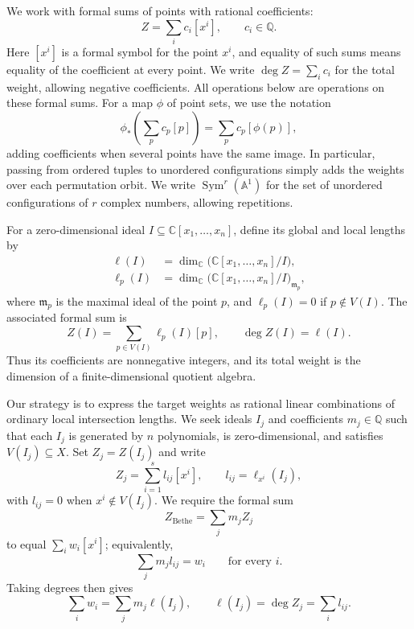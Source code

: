 \documentclass[11pt]{article}
\theoremstyle{definition}
\newcommand{\A}{\mathbb A}
\newcommand{\C}{\mathbb C}
\newcommand{\Sym}{\operatorname{Sym}}
\begin{document}
We work with formal sums of points with rational coefficients:
\[
 Z=\sum_i c_i[x^i],\qquad c_i\in\mathbb Q.
\]
Here $[x^i]$ is a formal symbol for the point $x^i$, and equality of
such sums means equality of the coefficient at every point. We write
$\deg Z=\sum_i c_i$ for the total weight, allowing negative coefficients.
All operations below are operations on these formal sums.
For a map $\phi$ of point sets, we use the notation
\[
 \phi_*\!\left(\sum_p c_p[p]\right)=\sum_p c_p[\phi(p)],
\]
adding coefficients when several points have the same image. In
particular, passing from ordered tuples to unordered configurations
simply adds the weights over each permutation orbit. We write
$\Sym^r(\A^1)$ for the set of unordered configurations of $r$ complex
numbers, allowing repetitions.

For a zero-dimensional ideal $I\subseteq\C[x_1,\ldots,x_n]$, define
its global and local lengths by
\[
 \begin{aligned}
 \ell(I)&=\dim_\C\bigl(\C[x_1,\ldots,x_n]/I\bigr),\\
 \ell_p(I)&=\dim_\C\bigl(\C[x_1,\ldots,x_n]/I\bigr)_{\mathfrak m_p},
 \end{aligned}
\]
where $\mathfrak m_p$ is the maximal ideal of the point $p$, and
$\ell_p(I)=0$ if $p\notin V(I)$. The associated formal sum is
\[
 Z(I)=\sum_{p\in V(I)}\ell_p(I)[p],\qquad
 \deg Z(I)=\ell(I).
\]
Thus its coefficients are nonnegative integers, and its total weight
is the dimension of a finite-dimensional quotient algebra.

Our strategy is to express the target weights as rational linear
combinations of ordinary local intersection lengths. We seek ideals
$I_j$ and coefficients $m_j\in\mathbb Q$ such that each $I_j$ is
generated by $n$ polynomials, is zero-dimensional, and satisfies
$V(I_j)\subseteq X$. Set $Z_j=Z(I_j)$ and write
\[
 Z_j=\sum_{i=1}^s l_{ij}[x^i],\qquad
 l_{ij}=\ell_{x^i}(I_j),
\]
with $l_{ij}=0$ when $x^i\notin V(I_j)$. We require the formal sum
\begin{equation}\label{eq:weight-cycle}
 Z_{\text{Bethe}}=\sum_jm_jZ_j
\end{equation}
to equal $\sum_iw_i[x^i]$; equivalently,
\begin{equation}\label{eq:local-weight-decomposition}
	\sum_j m_jl_{ij}=w_i\qquad\text{for every }i.
\end{equation}
Taking degrees then gives
\begin{equation}\label{eq:global-weight-decomposition}
 \sum_iw_i=\sum_jm_j\ell(I_j),\qquad
 \ell(I_j)=\deg Z_j=\sum_i l_{ij}.
\end{equation}
\end{document}
